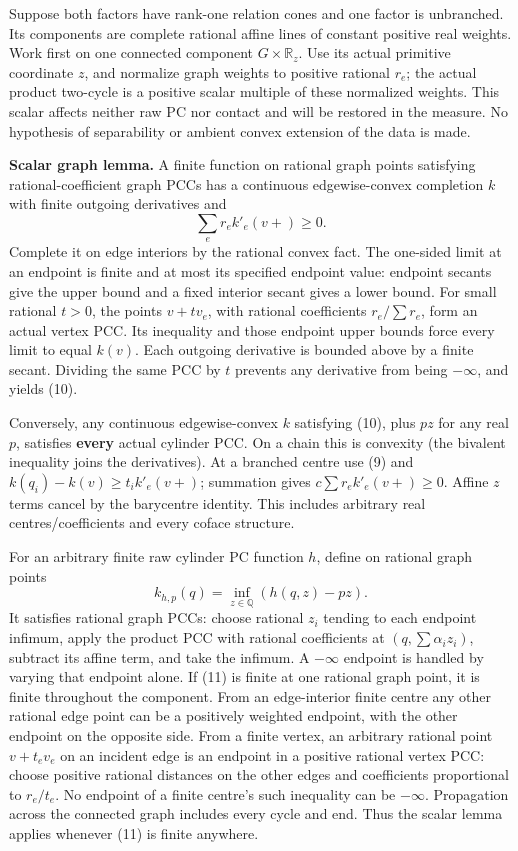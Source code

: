 \documentclass[
  11pt,
]{article}
\begin{document}
Suppose both factors have rank-one relation cones and one factor is
unbranched. Its components are complete rational affine lines of
constant positive real weights. Work first on one connected component
\(G\times\mathbb{R}_z\). Use its actual primitive coordinate \(z\), and
normalize graph weights to positive rational \(r_e\); the actual product
two-cycle is a positive scalar multiple of these normalized weights.
This scalar affects neither raw PC nor contact and will be restored in
the measure. No hypothesis of separability or ambient convex extension
of the data is made.

\textbf{Scalar graph lemma.} A finite function on rational graph points
satisfying rational-coefficient graph PCCs has a continuous
edgewise-convex completion \(k\) with finite outgoing derivatives and \[
                              \sum_e r_e k'_e(v+)\geq0.        \tag{10}
\] Complete it on edge interiors by the rational convex fact. The
one-sided limit at an endpoint is finite and at most its specified
endpoint value: endpoint secants give the upper bound and a fixed
interior secant gives a lower bound. For small rational \(t>0\), the
points \(v+t v_e\), with rational coefficients \(r_e/\sum r_e\), form an
actual vertex PCC. Its inequality and those endpoint upper bounds force
every limit to equal \(k(v)\). Each outgoing derivative is bounded above
by a finite secant. Dividing the same PCC by \(t\) prevents any
derivative from being \(-\infty\), and yields (10).

Conversely, any continuous edgewise-convex \(k\) satisfying (10), plus
\(pz\) for any real \(p\), satisfies \textbf{every} actual cylinder PCC.
On a chain this is convexity (the bivalent inequality joins the
derivatives). At a branched centre use (9) and
\(k(q_i)-k(v)\geq t_i k'_e(v+)\); summation gives
\(c\sum r_e k'_e(v+)\geq0\). Affine \(z\) terms cancel by the barycentre
identity. This includes arbitrary real centres/coefficients and every
coface structure.

For an arbitrary finite raw cylinder PC function \(h\), define on
rational graph points \[
 k_{h,p}(q)=\inf_{z\in\mathbb{Q}}(h(q,z)-pz).                 \tag{11}
\] It satisfies rational graph PCCs: choose rational \(z_i\) tending to
each endpoint infimum, apply the product PCC with rational coefficients
at \((q,\sum\alpha_i z_i)\), subtract its affine term, and take the
infimum. A \(-\infty\) endpoint is handled by varying that endpoint
alone. If (11) is finite at one rational graph point, it is finite
throughout the component. From an edge-interior finite centre any other
rational edge point can be a positively weighted endpoint, with the
other endpoint on the opposite side. From a finite vertex, an arbitrary
rational point \(v+t_ev_e\) on an incident edge is an endpoint in a
positive rational vertex PCC: choose positive rational distances on the
other edges and coefficients proportional to \(r_e/t_e\). No endpoint of
a finite centre's such inequality can be \(-\infty\). Propagation across
the connected graph includes every cycle and end. Thus the scalar lemma
applies whenever (11) is finite anywhere.
\end{document}
